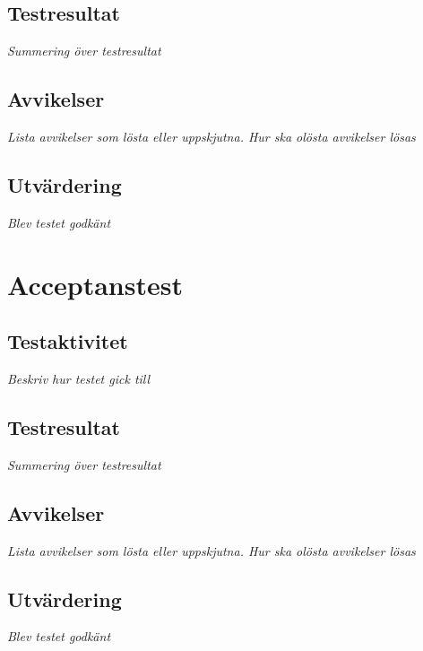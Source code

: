 \documentclass[a4paper,10pt]{article}
\begin{document}
\subsection{Testresultat}
\emph{Summering över testresultat}
\subsection{Avvikelser}
\emph{Lista avvikelser som lösta eller uppskjutna. Hur ska olösta avvikelser lösas}
\subsection{Utvärdering}
\emph{Blev testet godkänt}
\section{Acceptanstest}
\subsection{Testaktivitet}
\emph{Beskriv hur testet gick till}
\subsection{Testresultat}
\emph{Summering över testresultat}
\subsection{Avvikelser}
\emph{Lista avvikelser som lösta eller uppskjutna. Hur ska olösta avvikelser lösas}
\subsection{Utvärdering}
\emph{Blev testet godkänt}
\end{document}
